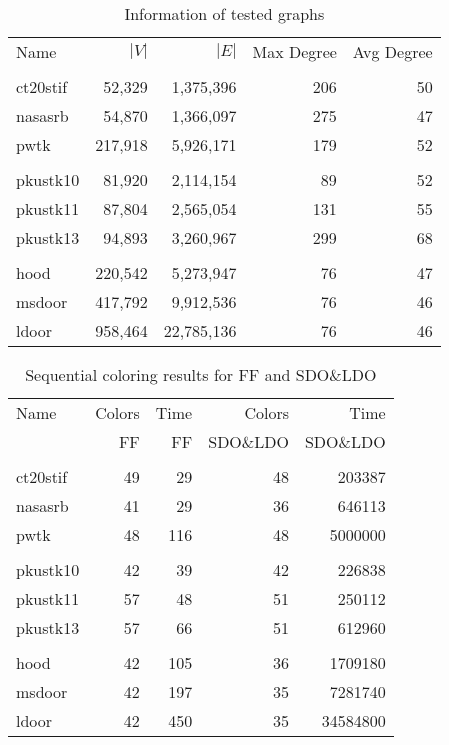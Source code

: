 \documentclass[preprint]{sigplanconf}
\begin{document}
\begin{table}
\scriptsize
\begin{center}
\begin{tabular}{l r r r r}
\hline
Name & $|V|$ & $|E|$ & Max Degree & Avg Degree \\
\\
\hline
ct20stif & 52,329 & 1,375,396 & 206 & 50 \\
nasasrb & 54,870 & 1,366,097 & 275 & 47 \\
pwtk  & 217,918 & 5,926,171 & 179 & 52 \\
\\
pkustk10 & 81,920 & 2,114,154 & 89 & 52 \\
pkustk11 & 87,804 & 2,565,054 & 131 & 55 \\
pkustk13 & 94,893 & 3,260,967 & 299 & 68\\
\\
hood & 220,542 & 5,273,947 & 76  & 47 \\
msdoor & 417,792 & 9,912,536 & 76 & 46 \\
ldoor & 958,464 & 22,785,136 & 76 & 46 \\

\end{tabular}
\caption{Information of tested graphs}
\label{amean_time}
\end{center}
\end{table}


\begin{table}
\scriptsize
\begin{center}
\begin{tabular}{l r r r r}
\hline
Name & Colors  & Time  & Colors & Time \\
 & FF & FF &   SDO$\&$LDO &  SDO$\&$LDO\\
\\
\hline
ct20stif & 49 & 29 & 48 & 203387 \\
nasasrb & 41 & 29 & 36 & 646113 \\
pwtk  & 48 & 116 & 48 & 5000000 \\
\\
pkustk10 & 42 & 39 & 42 & 226838 \\
pkustk11 & 57 & 48 & 51 & 250112 \\
pkustk13 & 57 & 66 & 51 & 612960\\
\\
hood & 42 & 105 & 36  & 1709180 \\
msdoor & 42 & 197 & 35 & 7281740 \\
ldoor & 42 & 450 & 35 & 34584800 \\

\end{tabular}
\caption{Sequential coloring results for FF and SDO$\&$LDO}
\label{amean_time}
\end{center}
\end{table}
\end{document}
